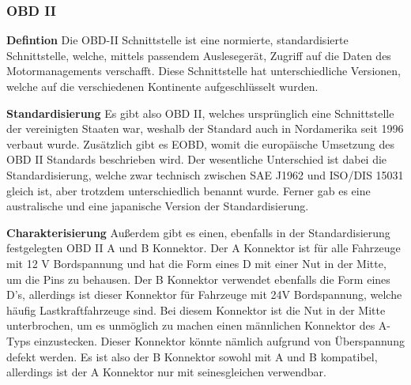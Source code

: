 \subsubsection{OBD II}
\label{subsec:obd2}

\textbf{Defintion\nextline}
Die OBD-II Schnittstelle ist eine normierte, standardisierte Schnittstelle, welche, mittels passendem Auslesegerät, Zugriff auf die Daten des Motormanagements verschafft. Diese Schnittstelle hat unterschiedliche Versionen, welche auf die verschiedenen Kontinente aufgeschlüsselt wurden. 

\textbf{Standardisierung\nextline}
Es gibt also OBD II, welches ursprünglich eine Schnittstelle der vereinigten Staaten war, weshalb der Standard auch in Nordamerika seit 1996 verbaut wurde. Zusätzlich gibt es EOBD, womit die europäische Umsetzung des OBD II Standards beschrieben wird.\cite{SIMR.CH2-CAN-Bus.EUP-D98/69/EC} Der wesentliche Unterschied ist dabei die Standardisierung, welche zwar technisch zwischen SAE J1962 und ISO/DIS 15031 gleich ist, aber trotzdem unterschiedlich benannt wurde. \cite{SIMR.CH2-CAN-Bus.SAEJ1962} Ferner gab es eine australische \cite{SIMR.CH2-CAN-Bus.AU-MVSA1989} und eine japanische Version der Standardisierung.

\textbf{Charakterisierung\nextline}
Außerdem gibt es einen, ebenfalls in der Standardisierung festgelegten OBD II A und B Konnektor. Der A Konnektor ist für alle Fahrzeuge mit 12 V Bordspannung und hat die Form eines D mit einer Nut in der Mitte, um die Pins zu behausen. Der B Konnektor verwendet ebenfalls die Form eines D's, allerdings ist dieser Konnektor für Fahrzeuge mit 24V Bordspannung, welche häufig Lastkraftfahrzeuge sind. Bei diesem Konnektor ist die Nut in der Mitte unterbrochen, um es unmöglich zu machen einen männlichen Konnektor des A-Typs einzustecken. Dieser Konnektor könnte  nämlich aufgrund von Überspannung defekt werden. Es ist also der B Konnektor sowohl mit A und B kompatibel, allerdings ist der A Konnektor nur mit seinesgleichen verwendbar.

